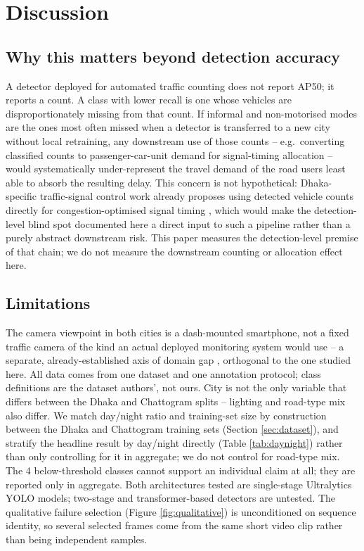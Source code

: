 \documentclass[conference,a4paper]{IEEEtran}
\begin{document}
\section{Discussion}
\label{sec:discussion}

\subsection{Why this matters beyond detection accuracy}
A detector deployed for automated traffic counting does not report AP50; it reports a
count. A class with lower recall is one whose vehicles are disproportionately missing
from that count. If informal and non-motorised modes are the ones most often missed
when a detector is transferred to a new city without local retraining, any downstream
use of those counts -- e.g.\ converting classified counts to passenger-car-unit
demand for signal-timing allocation -- would systematically under-represent the
travel demand of the road users least able to absorb the resulting delay. This concern
is not hypothetical: Dhaka-specific traffic-signal control work already proposes using
detected vehicle counts directly for congestion-optimised signal timing
\cite{azam2025dhakasignal}, which would make the detection-level blind spot documented
here a direct input to such a pipeline rather than a purely abstract downstream risk.
This paper measures the detection-level premise of that chain; we do not measure the
downstream counting or allocation effect here.

\subsection{Limitations}
The camera viewpoint in both cities is a dash-mounted smartphone, not a fixed traffic
camera of the kind an actual deployed monitoring system would use -- a separate,
already-established axis of domain gap \cite{sharma2026bmd45}, orthogonal to the one
studied here. All data comes from one dataset and one annotation protocol; class
definitions are the dataset authors', not ours. City is not the only variable that
differs between the Dhaka and Chattogram splits -- lighting and road-type mix also
differ. We match day/night ratio and training-set size by construction between the
Dhaka and Chattogram training sets (Section \ref{sec:dataset}), and stratify the
headline result by day/night directly (Table \ref{tab:daynight}) rather than only
controlling for it in aggregate; we do not control for road-type mix. The 4
below-threshold classes cannot support an individual claim at all; they are reported
only in aggregate. Both architectures tested are single-stage Ultralytics YOLO models;
two-stage and transformer-based detectors are untested. The qualitative failure selection (Figure \ref{fig:qualitative})
is unconditioned on sequence identity, so several selected frames come from the same
short video clip rather than being independent samples.
\end{document}
